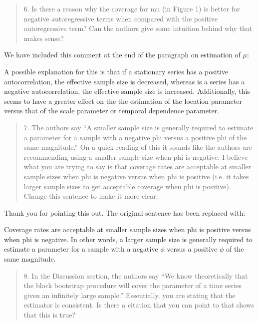 \documentclass[12pt]{article}
\newenvironment{comment}%
{\begin{quotation}\noindent\small\it\color{darkblue}\ignorespaces%
}{\end{quotation}}
\begin{document}
\begin{comment}
6.  Is there a reason why the coverage for mu (in Figure 1) is better for 
negative autoregressive terms when compared with the positive autoregressive 
term? Can the authors give some intuition behind why that makes sense? 
\end{comment}

We have included this comment at the end of the paragraph on estimation of 
$\mu$:

A possible explanation for this is that if a 
stationary series has a positive 
autocorrelation, the effective sample
size is decreased, whereas is a series has a negative autocorrelation, the
effective sample size is increased. Additionally, this seems to have a 
greater effect on the the estimation of the location parameter versus that
of the scale parameter or temporal dependence parameter.

\begin{comment}
7.  The authors say “A smaller sample size is generally required to estimate a 
parameter for a sample with a negative phi versus a positive phi of the same 
magnitude.”  On a quick reading of this it sounds like the authors are 
recommending using a smaller sample size when phi is negative.  I believe what 
you are trying to say is that coverage rates are acceptable at smaller sample 
sizes when phi is negative versus when phi is positive (i.e. it takes larger 
sample sizes to get acceptable coverage when phi is positive).  Change this 
sentence to make it more clear. 
\end{comment}

Thank you for pointing this out. The original sentence has been replaced 
with:

Coverage rates are acceptable at smaller sample 
sizes when phi is positive versus when phi is negative. In
other words, a larger sample size is generally required to estimate a 
parameter for a sample with a negative $\phi$ versus a positive $\phi$ of the 
same magnitude.

\begin{comment}
8.   In the Discussion section, the authors say “We know theoretically that the 
block bootstrap procedure will cover the parameter of a time series given an 
infinitely large sample.”  Essentially, you are stating that the estimator is 
consistent.  Is there a citation that you can point to that shows that this is 
true? 
\end{comment}

\citep{calhoun2018} 
\end{document}
